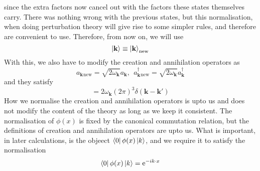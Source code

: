 \documentclass[11pt]{article}
\newcommand{\e}{\mathrm{e}}
\newcommand{\w}{\omega}
\renewcommand{\a}[1]{a_\mathbf{#1}}
\newcommand{\adag}[1]{a^\dagger_\mathbf{#1}}
\numberwithin{equation}{section}
\begin{document}
    since the extra factors now cancel out with the factors these states themselves carry. There was nothing wrong with the previous states, but this normalisation, when doing perturbation theory will give rise to some simpler rules, and therefore are convenient to use. Therefore, from now on, we will use 
    \begin{equation*}
        \ket{\textbf{k}}\equiv \ket{\textbf{k}}_{\text{new}}
    \end{equation*}
    With this, we also have to modify the creation and annihilation operators as 
    \begin{equation*}
        \a{k}{}_\text{new} = \sqrt{2\w_\textbf{k}}\a{k},~~\adag{k}{}_\text{new} = \sqrt{2\w_\textbf{k}}\adag{k}
    \end{equation*}
    and they satisfy
    \begin{equation*}
        [\a{k}{}_{\text{new}}, \adag{k}{}_{\text{new}}] = 2\w_\textbf{k} (2\pi)^3\delta(\textbf{k} - \textbf{k}')
    \end{equation*}
    How we normalise the creation and annihilation operators is upto us and does not modify the content of the theory as long as we keep it consistent. The normalisation of \(\phi(x)\) is fixed by the canonical commutation relation, but the definitions of creation and annihilation operators are upto us. What is important, in later calculations, is the objeect \(\bra{0}\phi(x)\ket{k}\), and we require it to satisfy the normalisation 
    \begin{equation*}
        \bra{0}\phi(x)\ket{k} = \e^{-ik\cdot x} 
    \end{equation*}
\end{document}
